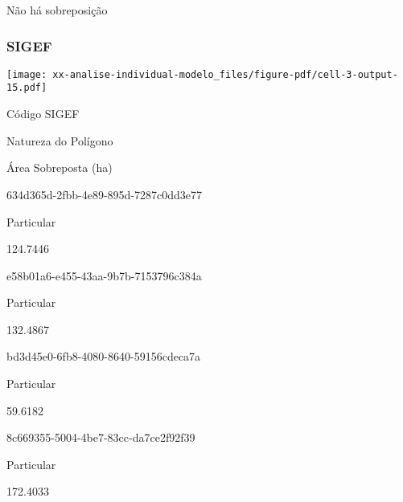\documentclass[
  11pt,
  a4paper,
  DIV=11,
  numbers=noendperiod]{scrartcl}
\begin{document}
Não há sobreposição

\subsubsection{SIGEF}\label{sigef}

\texttt{[image: xx-analise-individual-modelo\_files/figure-pdf/cell-3-output-15.pdf]}

\n  

\n    

\n      

Código SIGEF

\n      

Natureza do Polígono

\n      

Área Sobreposta (ha)

\n    

\n  

\n  

\n    

\n      

634d365d-2fbb-4e89-895d-7287c0dd3e77

\n      

Particular

\n      

124.7446

\n    

\n    

\n      

e58b01a6-e455-43aa-9b7b-7153796c384a

\n      

Particular

\n      

132.4867

\n    

\n    

\n      

bd3d45e0-6fb8-4080-8640-59156cdeca7a

\n      

Particular

\n      

59.6182

\n    

\n    

\n      

8c669355-5004-4be7-83cc-da7ce2f92f39

\n      

Particular

\n      

172.4033
\end{document}
